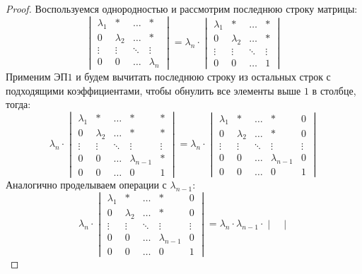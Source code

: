 \documentclass[12pt]{article}
\theoremstyle{definition}
\begin{document}
\begin{proof}
	Воспользуемся однородностью и рассмотрим последнюю строку матрицы:
	$$
		\begin{vmatrix}
			\lambda_1 & * & \dotsc & * \\
			0 & \lambda_2 &  \dotsc & *\\
			\vdots & \vdots & \ddots & \vdots\\
			0 & 0 & \dotsc & \lambda_n
		\end{vmatrix} = 
		\lambda_n{\cdot}
		\begin{vmatrix}
			\lambda_1 & * & \dotsc & * \\
			0 & \lambda_2 &  \dotsc & *\\
			\vdots & \vdots & \ddots & \vdots\\
			0 & 0 & \dotsc & 1
		\end{vmatrix}
	$$
	Применим ЭП$1$ и будем вычитать последнюю строку из остальных строк с подходящими коэффициентами, чтобы обнулить все элементы выше $1$ в столбце, тогда:
	$$
		\lambda_n{\cdot}
		\begin{vmatrix}
			\lambda_1 & * & \dotsc & * & * \\
			0 & \lambda_2 &  \dotsc & * & *\\
			\vdots & \vdots & \ddots & \vdots & \vdots\\
			0 & 0 & \dotsc & \lambda_{n-1} & *\\
			0 & 0 & \dotsc & 0 & 1
		\end{vmatrix} = 
		\lambda_n{\cdot}
		\begin{vmatrix}
			\lambda_1 & * & \dotsc & * &  0 \\
			0 & \lambda_2 &  \dotsc & * & 0\\
			\vdots & \vdots & \ddots & \vdots & \vdots\\
			0 & 0 & \dotsc & \lambda_{n-1} & 0\\
			0 & 0 & \dotsc & 0 & 1
		\end{vmatrix}
	$$
	Аналогично проделываем операции с $\lambda_{n-1}$:
	$$
		\lambda_n{\cdot}
		\begin{vmatrix}
			\lambda_1 & * & \dotsc & * &  0 \\
			0 & \lambda_2 &  \dotsc & * & 0\\
			\vdots & \vdots & \ddots & \vdots & \vdots\\
			0 & 0 & \dotsc & \lambda_{n-1} & 0\\
			0 & 0 & \dotsc & 0 & 1
		\end{vmatrix} = 
		\lambda_n{\cdot}\lambda_{n-1}{\cdot}
		\begin{vmatrix}

\end{vmatrix}$$
\end{proof}
\end{document}
